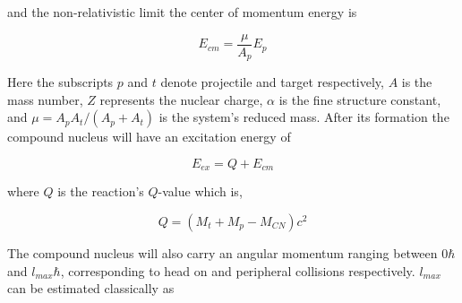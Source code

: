 and the non-relativistic limit the center of momentum energy is

\begin{equation}
\label{eqn:cmf_en}
E_{cm} = \frac{\mu}{A_{p}}E_{p}
\end{equation}

Here the subscripts $p$ and $t$ denote projectile and target respectively, $A$ is the mass number, $Z$ represents the nuclear charge, $\alpha{}$ is the fine structure constant, and $\mu = A_{p}A_{t}/(A_{p}+A_{t})$ is the system's reduced mass. After its formation the compound nucleus will have an excitation energy of

\begin{equation}
\label{eqn:cn_ex}
E_{ex} = Q + E_{cm}
\end{equation}

where $Q$ is the reaction's $Q$-value which is,

\begin{equation}
\label{eqn:cn_form_qvalue}
Q = (M_t+M_p-M_{CN})c^2
\end{equation}

The compound nucleus will also carry an angular momentum ranging between $0 \hbar$ and $l_{max} \hbar$, corresponding to head on and peripheral collisions respectively. $l_{max}$ can be estimated classically as

